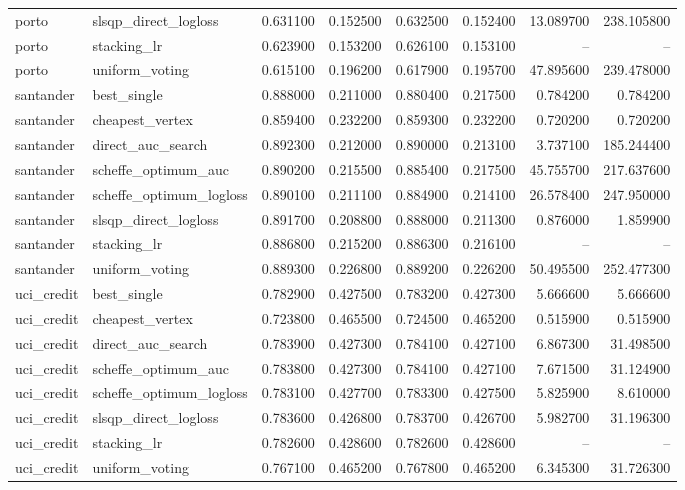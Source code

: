 \begin{longtable}{llrrrrrr}
porto & slsqp\_direct\_logloss & 0.631100 & 0.152500 & 0.632500 & 0.152400 & 13.089700 & 238.105800 \\
porto & stacking\_lr & 0.623900 & 0.153200 & 0.626100 & 0.153100 & -- & -- \\
porto & uniform\_voting & 0.615100 & 0.196200 & 0.617900 & 0.195700 & 47.895600 & 239.478000 \\
santander & best\_single & 0.888000 & 0.211000 & 0.880400 & 0.217500 & 0.784200 & 0.784200 \\
santander & cheapest\_vertex & 0.859400 & 0.232200 & 0.859300 & 0.232200 & 0.720200 & 0.720200 \\
santander & direct\_auc\_search & 0.892300 & 0.212000 & 0.890000 & 0.213100 & 3.737100 & 185.244400 \\
santander & scheffe\_optimum\_auc & 0.890200 & 0.215500 & 0.885400 & 0.217500 & 45.755700 & 217.637600 \\
santander & scheffe\_optimum\_logloss & 0.890100 & 0.211100 & 0.884900 & 0.214100 & 26.578400 & 247.950000 \\
santander & slsqp\_direct\_logloss & 0.891700 & 0.208800 & 0.888000 & 0.211300 & 0.876000 & 1.859900 \\
santander & stacking\_lr & 0.886800 & 0.215200 & 0.886300 & 0.216100 & -- & -- \\
santander & uniform\_voting & 0.889300 & 0.226800 & 0.889200 & 0.226200 & 50.495500 & 252.477300 \\
uci\_credit & best\_single & 0.782900 & 0.427500 & 0.783200 & 0.427300 & 5.666600 & 5.666600 \\
uci\_credit & cheapest\_vertex & 0.723800 & 0.465500 & 0.724500 & 0.465200 & 0.515900 & 0.515900 \\
uci\_credit & direct\_auc\_search & 0.783900 & 0.427300 & 0.784100 & 0.427100 & 6.867300 & 31.498500 \\
uci\_credit & scheffe\_optimum\_auc & 0.783800 & 0.427300 & 0.784100 & 0.427100 & 7.671500 & 31.124900 \\
uci\_credit & scheffe\_optimum\_logloss & 0.783100 & 0.427700 & 0.783300 & 0.427500 & 5.825900 & 8.610000 \\
uci\_credit & slsqp\_direct\_logloss & 0.783600 & 0.426800 & 0.783700 & 0.426700 & 5.982700 & 31.196300 \\
uci\_credit & stacking\_lr & 0.782600 & 0.428600 & 0.782600 & 0.428600 & -- & -- \\
uci\_credit & uniform\_voting & 0.767100 & 0.465200 & 0.767800 & 0.465200 & 6.345300 & 31.726300 \\
\end{longtable}\endgroup\addtocounter{table}{-1}
